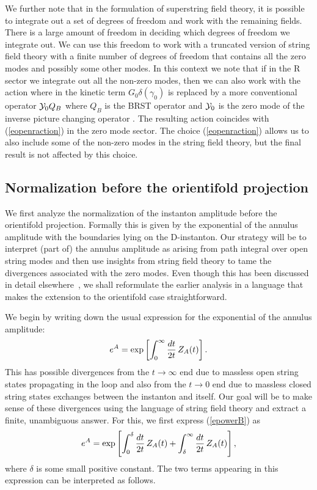 \documentclass[12pt,a4paper]{article}
\newcommand{\be}{\begin{equation}}
\newcommand{\ee}{\end{equation}}
\newcommand{\refb}[1]{(\ref{#1})}
\def\[{\left[}
\def\]{\right]}
\newcommand{\YY}{{\cal Y}}
\begin{document}
We further note that in the formulation of superstring field theory, it is possible to integrate
out a set of degrees of freedom and work with the remaining fields. There is a large amount of
freedom in deciding which degrees of freedom
we integrate out. We can use this
freedom to work with a truncated version of string field theory with a finite number of
degrees of freedom that contains all the zero modes and possibly some other modes.
In this context we note that if in the R sector we integrate out all the non-zero modes,
then we can also work with the action where in the kinetic term $G_0\delta(\gamma_0)$
is replaced by a more conventional operator $\YY_0 Q_B$
where $Q_B$ is the BRST operator and $\YY_0$ is the zero mode of the inverse
picture changing operator \cite{Sen:2021tpp}. The resulting action coincides with
\refb{eopenraction} in the zero mode sector. The choice \refb{eopenraction} allows us to also
include some of the non-zero modes in the string field theory, but the final result
is not affected by this choice.

\subsection{Normalization before the orientifold projection} \label{sorientdef}

We first analyze the normalization of the instanton amplitude before the orientifold
projection. Formally this is given by the exponential of the annulus amplitude with
the boundaries lying on the D-instanton. Our strategy will be to interpret (part of)
the annulus amplitude as arising from path integral over open string modes and then
use insights from string field theory to tame the divergences associated with the
zero modes.
Even though this has been discussed in detail
elsewhere~\cite{Sen:2021qdk,Sen:2021tpp,Sen:2021jbr,Alexandrov:2021shf,
Alexandrov:2021dyl},  we shall reformulate
the earlier analysis in a language that makes the extension to the orientifold case
straightforward.

We begin by writing down the usual expression for the exponential of the annulus amplitude:
\be\label{epowerB}
e^A=
\exp\[\int_0^\infty {dt\over 2t} \, Z_A(t)\].
\ee
This has possible divergences from the $t\to\infty$ end due to massless open string states
propagating in the loop and also from the $t\to 0$ end due to massless closed string
states exchanges between the instanton and itself. Our goal will be to make sense of these
divergences using the language of string field theory and extract a finite, unambiguous
answer. For this, we first express \refb{epowerB} as
\be \label{eccd2}
e^A=
\exp\[\int_0^{\delta} {dt\over 2t} \, Z_A(t)
+ \int_{\delta}^\infty {dt\over 2t} \, Z_A(t)\] ,
\ee
where $\delta$ is some small positive constant.
The two terms appearing in this expression can be  interpreted as follows.
\end{document}
